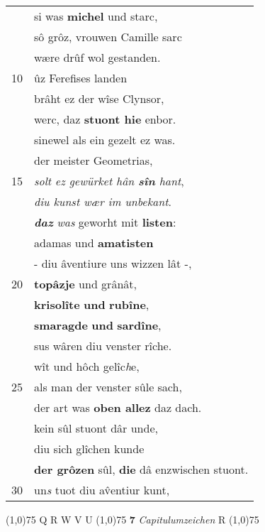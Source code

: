 \documentclass[8pt,a4paper,notitlepage]{article}
\begin{document}
\begin{table}[ht]
\begin{minipage}[t]{0.5\linewidth}
\begin{tabular}{rl}
 & si was \textbf{michel} und starc,\\ 
 & sô grôz, vrouwen Camille sarc\\ 
 & wære drûf wol gestanden.\\ 
10 & ûz Ferefises landen\\ 
 & brâht ez der wîse Clynsor,\\ 
 & werc, daz \textbf{stuont hie} enbor.\\ 
 & sinewel als ein gezelt ez was.\\ 
 & der meister Geometrias,\\ 
15 & \textit{solt ez gewürket hân \textbf{sîn} hant},\\ 
 & \textit{diu kunst wær im unbekant}.\\ 
 & \textit{\textbf{daz}} \textit{was} geworht mit \textbf{listen}:\\ 
 & adamas und \textbf{amatisten}\\ 
 & - diu âventiure uns wizzen lât -,\\ 
20 & \textbf{topâzje} und grânât,\\ 
 & \textbf{krisolîte} \textbf{und} \textbf{rubîne},\\ 
 & \textbf{smaragde} \textbf{und} \textbf{sardîne},\\ 
 & sus wâren diu venster rîche.\\ 
 & wît und hôch gelîc\textit{h}e,\\ 
25 & als man der venster sûle sach,\\ 
 & der art was \textbf{oben allez} daz dach.\\ 
 & kein sûl stuont dâr unde,\\ 
 & diu sich glîchen kunde\\ 
 & \textbf{der grôzen} sûl, \textbf{die} dâ enzwischen stuont.\\ 
30 & un\textit{s} tuot diu av̂entiur kunt,\\ 
\end{tabular}
\scriptsize
\line(1,0){75} \newline
Q R W V U \newline
\line(1,0){75} \newline
\textbf{7} \textit{Capitulumzeichen} R  \newline
\line(1,0){75} \newline

\end{minipage}
\end{table}
\end{document}
